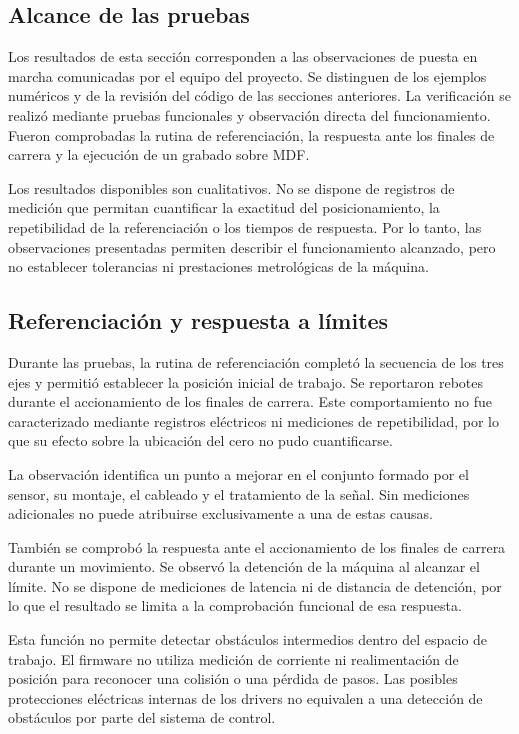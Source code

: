 \documentclass[blue,fullpaper]{ludusofficial}  %
\begin{document}
\subsection{Alcance de las pruebas}

Los resultados de esta sección corresponden a las observaciones de puesta en marcha comunicadas por el equipo del proyecto. Se distinguen de los ejemplos numéricos y de la revisión del código de las secciones anteriores. La verificación se realizó mediante pruebas funcionales y observación directa del funcionamiento. Fueron comprobadas la rutina
de referenciación, la respuesta ante los finales
de carrera y la ejecución de un grabado sobre MDF.

Los resultados disponibles son cualitativos.
No se dispone de registros de medición que permitan
cuantificar la exactitud del posicionamiento,
la repetibilidad de la referenciación o los tiempos
de respuesta. Por lo tanto, las observaciones
presentadas permiten describir el funcionamiento
alcanzado, pero no establecer tolerancias
ni prestaciones metrológicas de la máquina.

\subsection{Referenciación y respuesta a límites}

Durante las pruebas, la rutina de referenciación
completó la secuencia de los tres ejes y permitió
establecer la posición inicial de trabajo.
Se reportaron rebotes durante el accionamiento
de los finales de carrera. Este comportamiento
no fue caracterizado mediante registros eléctricos
ni mediciones de repetibilidad, por lo que su efecto
sobre la ubicación del cero no pudo cuantificarse.

La observación identifica un punto a mejorar
en el conjunto formado por el sensor, su montaje,
el cableado y el tratamiento de la señal.
Sin mediciones adicionales no puede atribuirse
exclusivamente a una de estas causas.

También se comprobó la respuesta ante el accionamiento
de los finales de carrera durante un movimiento.
Se observó la detención de la máquina al alcanzar
el límite. No se dispone de mediciones de latencia
ni de distancia de detención, por lo que el resultado
se limita a la comprobación funcional de esa respuesta.

Esta función no permite detectar obstáculos
intermedios dentro del espacio de trabajo.
El firmware no utiliza medición de corriente
ni realimentación de posición para reconocer
una colisión o una pérdida de pasos.
Las posibles protecciones eléctricas internas
de los drivers no equivalen a una detección
de obstáculos por parte del sistema de control.
\end{document}
